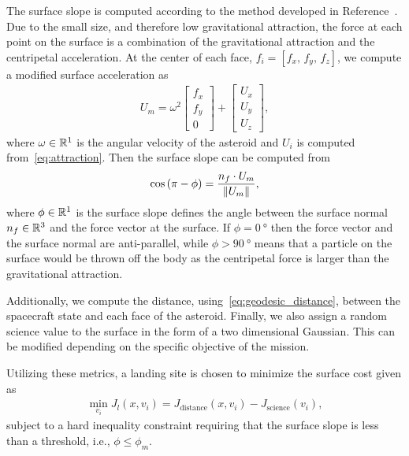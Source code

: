 \documentclass[journal]{new-aiaa}
\begin{document}
The surface slope is computed according to the method developed in Reference~\cite{scheeres1996}.
Due to the small size, and therefore low gravitational attraction, the force at each point on the surface is a combination of the gravitational attraction and the centripetal acceleration.
At the center of each face, \( f_i = [ f_x,\,  f_y,\,  f_z ] \), we compute a modified surface acceleration as
\begin{align}\label{eq:surface_force}
    U_m = \omega^2 \begin{bmatrix} f_x \\ f_y \\ 0 \end{bmatrix} + \begin{bmatrix} U_x \\ U_y \\ U_z \end{bmatrix},
\end{align}
where \( \omega \in \mathbb{R}^1 \) is the angular velocity of the asteroid and \( U_i \) is computed from~\cref{eq:attraction}.
Then the surface slope can be computed from
\begin{align}\label{eq:surface_slope}
    \cos \left(  \pi - \phi  \right) = \frac{n_f \cdot U_m}{\left\| U_m \right\|},
\end{align}
where \( \phi \in \mathbb{R}^1 \) is the surface slope defines the angle between the surface normal \( n_f \in \mathbb{R}^3 \) and the force vector at the surface.
If \( \phi = \SI{0}{\degree} \) then the force vector and the surface normal are anti-parallel, while \( \phi > \SI{90}{\degree} \) means that a particle on the surface would be thrown off the body as the centripetal force is larger than the gravitational attraction.

Additionally, we compute the distance, using~\cref{eq:geodesic_distance}, between the spacecraft state and each face of the asteroid. 
Finally, we also assign a random science value to the surface in the form of a two dimensional Gaussian.
This can be modified depending on the specific objective of the mission. 

Utilizing these metrics, a landing site is chosen to minimize the surface cost given as
\begin{align}\label{eq:surface_cost}
    \min_{v_i} J_l(x, v_i) =  J_{\text{distance}}(x, v_i) - J_{\text{science}}(v_i),
\end{align}
subject to a hard inequality constraint requiring that the surface slope is less than a threshold, i.e., \( \phi \leq \phi_m \).
\end{document}
